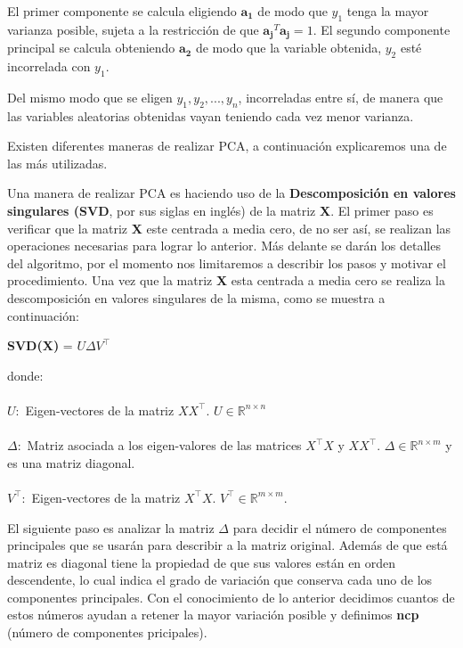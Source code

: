 El primer componente se calcula eligiendo $\mathbf{a_{1}}$ de modo que $y_{1}$ tenga la mayor varianza posible, sujeta a la restricción de que $\mathbf{a_{j}}^{T} \mathbf{a_{j}} = 1$. El segundo componente principal se calcula obteniendo $\mathbf{a_{2}}$ de modo que la variable obtenida, $y_{2}$ esté incorrelada con $y_{1}$.

Del mismo modo que se eligen $y_{1}, y_{2}, ..., y_{n}$, incorreladas entre sí, de manera que las variables aleatorias obtenidas vayan teniendo cada vez menor varianza.

Existen diferentes maneras de realizar PCA, a continuación explicaremos una de las más utilizadas.

Una manera de realizar PCA es haciendo uso de la \textbf{Descomposición en valores singulares (SVD}, por sus siglas en inglés) de la matriz \textbf{X}. El primer paso es verificar que la matriz \textbf{X} este centrada a media cero, de no ser así, se realizan las operaciones necesarias para lograr lo anterior. Más delante se darán los detalles del algoritmo, por el momento nos limitaremos a describir los pasos y motivar el procedimiento. Una vez que la matriz \textbf{X} esta centrada a media cero se realiza la descomposición en valores singulares de la misma, como se muestra a continuación: 

\begin{center}
	\textbf{SVD(X)} = $U \Delta V ^\top$ 
\end{center}

donde: \\ \\

\noindent \textbf{$U:$ } Eigen-vectores de la matriz $XX^\top.$ $U \in \mathbb{R}^{n\times n}$ \\ \\
\textbf{$\Delta:$ }Matriz asociada a los eigen-valores de las matrices $X^\top X$ y $XX^\top$. $\Delta \in \mathbb{R}^{n\times m} $ y es una matriz diagonal.\\ \\
\textbf{$V^\top:$ }Eigen-vectores de la matriz $X^\top X$. $V^\top \in \mathbb{R}^{m\times m}$.

El siguiente paso es analizar la matriz $\Delta$ para decidir el número de componentes principales que se usarán para describir a la matriz original. Además de que está matriz es diagonal tiene la propiedad de que sus valores están en orden descendente, lo cual indica el grado de variación que conserva cada uno de los componentes principales. Con el conocimiento de lo anterior decidimos cuantos de estos números ayudan a retener la mayor variación posible y definimos \textbf{ncp} (número de componentes pricipales).

